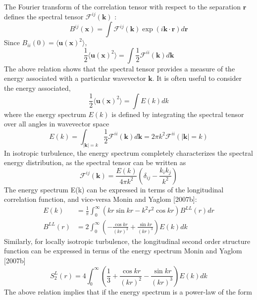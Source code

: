 The Fourier transform of the correlation tensor with respect to the separation $\mathbf{r}$ defines the spectral tensor $\mathcal{F}^{ij}(\mathbf{k})$ :
\begin{equation}
    B^{ij}(\mathbf{x})=\int\mathcal{F}^{ij}(\mathbf{k})\exp(i\mathbf{k}\cdot\mathbf{r})d\mathbf{r}
\end{equation}
Since $B_{ii}(0)=\langle\mathbf{u}(\mathbf{x})^2\rangle$, 
\begin{equation}
    \frac{1}{2}\langle\mathbf{u}(\mathbf{x})^2\rangle=\int\frac{1}{2}\mathcal{F}^{ii}(\mathbf{k})d\mathbf{k}
\end{equation}
The above relation shows that the spectral tensor provides a measure of the energy associated with a particular wavevector $\mathbf{k}$. It is often useful to consider the energy associated, 
\begin{equation}
     \frac{1}{2}\langle\mathbf{u}(\mathbf{x})^2\rangle=\int E(k)dk
\end{equation}
where the energy spectrum $E(k)$ is defined by integrating the spectral tensor over all angles in wavevector space
\begin{equation}
    E(k)=\int_{|\mathbf{k}|=k}\frac{1}{2}\mathcal{F}^{ii}(\mathbf{k})d\mathbf{k}=2\pi k^2\mathcal{F}^{ii}(|\mathbf{k}|=k)
\end{equation}
In isotropic turbulence, the energy spectrum completely characterizes the spectral energy distribution, as the spectral tensor can be written as
\begin{equation}
    \mathcal{F}^{ij}(\mathbf{k})=\frac{E(k)}{4\pi k^2}\left(\delta_{ij}-\frac{k_ik_j}{k^2}\right)
\end{equation}
The energy spectrum E(k) can be expressed in terms of the longitudinal correlation function, and vice-versa Monin and Yaglom [2007b]:
\begin{align}
    E(k)&=\frac{1}{\pi}\int_0^\infty(kr\sin kr-k^2r^2\cos kr)B^{LL}(r)dr\\
    B^{LL}(r)&=2\int_0^\infty\left(-\frac{\cos kr}{(kr)^2}+\frac{\sin kr}{(kr)^3}\right)E(k)dk
\end{align}
Similarly, for locally isotropic turbulence, the longitudinal second order structure function can be expressed in terms of the energy spectrum Monin and Yaglom [2007b]
\begin{equation}
    S^L_2(r)=4\int_0^\infty\left(\frac{1}{3}+\frac{\cos kr}{(kr)^2}-\frac{\sin kr}{(kr)^3}\right)E(k)dk
\end{equation}
The above relation implies that if the energy spectrum is a power-law of the form
